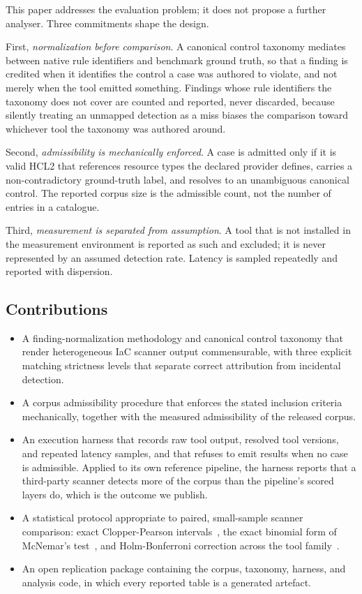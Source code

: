 \documentclass[journal]{IEEEtran}
\begin{document}
This paper addresses the evaluation problem; it does not propose a further
analyser. Three commitments shape the design.

First, \textit{normalization before comparison}. A canonical control taxonomy
mediates between native rule identifiers and benchmark ground truth, so that a
finding is credited when it identifies the control a case was authored to
violate, and not merely when the tool emitted something. Findings whose rule
identifiers the taxonomy does not cover are counted and reported, never
discarded, because silently treating an unmapped detection as a miss biases the
comparison toward whichever tool the taxonomy was authored around.

Second, \textit{admissibility is mechanically enforced}. A case is admitted only
if it is valid HCL2 that references resource types the declared provider defines,
carries a non-contradictory ground-truth label, and resolves to an unambiguous
canonical control. The reported corpus size is the admissible count, not the
number of entries in a catalogue.

Third, \textit{measurement is separated from assumption}. A tool that is not
installed in the measurement environment is reported as such and excluded; it is
never represented by an assumed detection rate. Latency is sampled repeatedly and
reported with dispersion.

\subsection{Contributions}
\begin{itemize}
\item A finding-normalization methodology and canonical control taxonomy that
render heterogeneous IaC scanner output commensurable, with three explicit
matching strictness levels that separate correct attribution from incidental
detection.
\item A corpus admissibility procedure that enforces the stated inclusion
criteria mechanically, together with the measured admissibility of the released
corpus.
\item An execution harness that records raw tool output, resolved tool versions,
and repeated latency samples, and that refuses to emit results when no case is
admissible. Applied to its own reference pipeline, the harness reports that a
third-party scanner detects more of the corpus than the pipeline's scored layers
do, which is the outcome we publish.
\item A statistical protocol appropriate to paired, small-sample scanner
comparison: exact Clopper-Pearson intervals~\cite{clopper1934use}, the exact
binomial form of McNemar's test~\cite{mcnemar1947note, dietterich1998approximate},
and Holm-Bonferroni correction across the tool family~\cite{holm1979simple}.
\item An open replication package containing the corpus, taxonomy, harness, and
analysis code, in which every reported table is a generated artefact.
\end{itemize}
\end{document}
